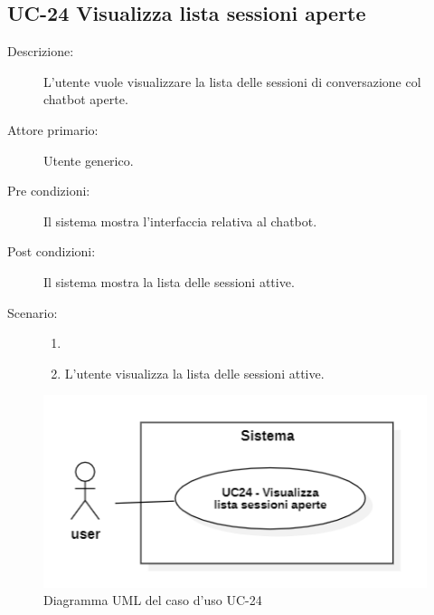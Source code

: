 \subsection{UC-24 Visualizza lista sessioni aperte}
\begin{description}
    \item[Descrizione:] L'utente vuole visualizzare la lista delle sessioni di conversazione col chatbot aperte.
    \item[Attore primario:] Utente generico.
    \item[Pre condizioni:] Il sistema mostra l'interfaccia relativa al chatbot.
    \item[Post condizioni:] Il sistema mostra la lista delle sessioni attive.
    \item[Scenario:]
    \begin{enumerate}
        \item[]
        \item L'utente visualizza la lista delle sessioni attive.
    \end{enumerate}
\end{description}

\begin{figure}[H]
    \centering
    \includegraphics[width=0.8\linewidth]{UC24.PNG}
    \caption{Diagramma UML del caso d'uso UC-24}
\end{figure}

